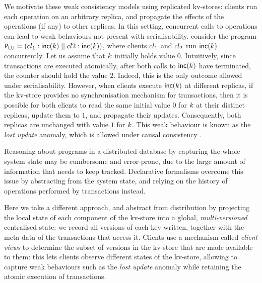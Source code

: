We motivate these weak consistency models using replicated kv-stores: 
clients run each operation on an arbitrary replica, and
propagate the effects of the operations (if any) to other
replicas. In this setting, concurrent calls to 
operations can lead to weak behaviours not present with
serialisability.
consider the program $\mathtt{P}_{\mathsf{LU}} = \left({cl}_1 : \mathsf{inc}(k) \;|| \; {cl}2: \mathsf{inc}(k) \right)$, where clients ${cl}_1$ and 
${cl}_2$  run $\mathsf{inc}(k)$ concurrently.
%
Let us assume that  $k$ initially holds value $0$.
Intuitively, since transactions are executed atomically, after both
calls to $\mathsf{inc}(k)$ have terminated, the counter should hold 
the value $2$.
Indeed, this is the only outcome allowed under serialisability. 
However, when clients execute $\mathsf{inc}(k)$ at different replicas,
if the kv-store provides no synchronisation mechanism for transactions,
then it is possible for both clients to read the same initial value $0$ for $k$ at their
distinct replicas, update them to $1$, and propagate their updates. Consequently, both
replicas are unchanged with value  $1$ for $k$.
This weak behaviour is known as the \emph{lost update} anomaly, which
is  allowed under causal consistency \cite{cops,wren,redblue}.


Reasoning about programs in a distributed database by capturing the 
whole system state may be cumbersome and error-prone, 
due to the large amount of information that needs to keep tracked. 
Declarative formalisms overcome this issue by abstracting 
from the system state, and relying on the history of operations performed 
by transactions instead.

Here we take a different approach, and abstract from 
distribution by projecting the local state of each component 
of the kv-store into a global, \emph{multi-versioned} centralised state: 
we record all versions of each key written, 
together with the meta-data of the transactions that access it. 
Clients use a mechanism called \emph{client views} to determine 
the subset of versions in the kv-store that are made available to them:
this lets clients observe different states 
of the kv-store, allowing to capture weak behaviours such as the \emph{lost update} anomaly 
while retaining the atomic execution of transactions.


